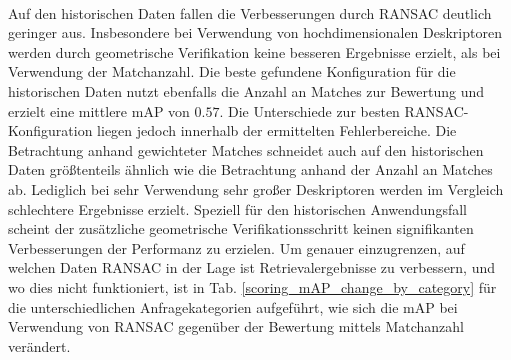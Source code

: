 \\
Auf den historischen Daten fallen die Verbesserungen durch RANSAC deutlich geringer aus. Insbesondere bei Verwendung von hochdimensionalen Deskriptoren werden durch geometrische Verifikation keine besseren Ergebnisse erzielt, als bei Verwendung der Matchanzahl. Die beste gefundene Konfiguration für die historischen Daten nutzt ebenfalls die Anzahl an Matches zur Bewertung und erzielt eine mittlere mAP von $0.57$. Die Unterschiede zur besten RANSAC-Konfiguration liegen jedoch innerhalb der ermittelten Fehlerbereiche. Die Betrachtung anhand gewichteter Matches schneidet auch auf den historischen Daten größtenteils ähnlich wie die Betrachtung anhand der Anzahl an Matches ab. Lediglich bei sehr Verwendung sehr großer Deskriptoren werden im Vergleich schlechtere Ergebnisse erzielt. Speziell für den historischen Anwendungsfall scheint der zusätzliche geometrische Verifikationsschritt keinen signifikanten Verbesserungen der Performanz zu erzielen.
Um genauer einzugrenzen, auf welchen Daten RANSAC in der Lage ist Retrievalergebnisse zu verbessern, und wo dies nicht funktioniert, ist in Tab. \ref{scoring_mAP_change_by_category} für die unterschiedlichen Anfragekategorien aufgeführt, wie sich die mAP bei Verwendung von RANSAC gegenüber der Bewertung mittels Matchanzahl verändert.
\\
